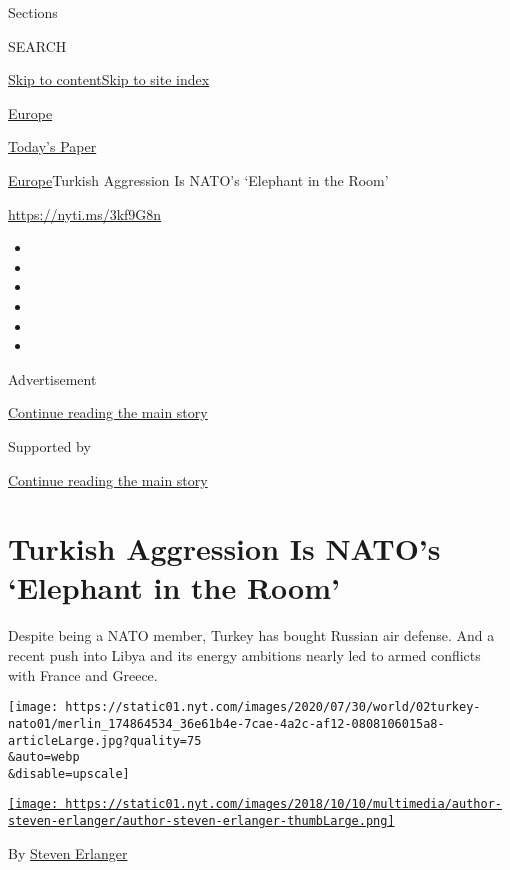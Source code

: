 Sections

SEARCH

\protect\hyperlink{site-content}{Skip to
content}\protect\hyperlink{site-index}{Skip to site index}

\href{https://www.nytimes.com/section/world/europe}{Europe}

\href{https://myaccount.nytimes.com/auth/login?response_type=cookie\&client_id=vi}{}

\href{https://www.nytimes.com/section/todayspaper}{Today's Paper}

\href{/section/world/europe}{Europe}\textbar{}Turkish Aggression Is
NATO's `Elephant in the Room'

\url{https://nyti.ms/3kf9G8n}

\begin{itemize}
\item
\item
\item
\item
\item
\item
\end{itemize}

Advertisement

\protect\hyperlink{after-top}{Continue reading the main story}

Supported by

\protect\hyperlink{after-sponsor}{Continue reading the main story}

\hypertarget{turkish-aggression-is-natos-elephant-in-the-room}{%
\section{Turkish Aggression Is NATO's `Elephant in the
Room'}\label{turkish-aggression-is-natos-elephant-in-the-room}}

Despite being a NATO member, Turkey has bought Russian air defense. And
a recent push into Libya and its energy ambitions nearly led to armed
conflicts with France and Greece.

\texttt{[image: https://static01.nyt.com/images/2020/07/30/world/02turkey-nato01/merlin\_174864534\_36e61b4e-7cae-4a2c-af12-0808106015a8-articleLarge.jpg?quality=75\\\&auto=webp\\\&disable=upscale]}

\href{https://www.nytimes.com/by/steven-erlanger}{\texttt{[image: https://static01.nyt.com/images/2018/10/10/multimedia/author-steven-erlanger/author-steven-erlanger-thumbLarge.png]}}

By \href{https://www.nytimes.com/by/steven-erlanger}{Steven Erlanger}

